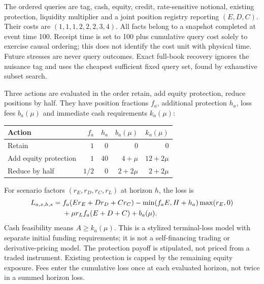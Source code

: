 \documentclass[11pt,a4paper]{article}
\theoremstyle{definition}\newtheorem{definition}[theorem]{Definition}
\begin{document}
The ordered queries are tag, cash, equity, credit, rate-sensitive notional, existing protection, liquidity multiplier and a joint position registry reporting $(E,D,C)$. Their costs are $(1,1,1,2,2,2,3,4)$. All facts belong to a snapshot completed at event time 100. Receipt time is set to 100 plus cumulative query cost solely to exercise causal ordering; this does not identify the cost unit with physical time. Future stresses are never query outcomes. Exact full-book recovery ignores the nuisance tag and uses the cheapest sufficient fixed query set, found by exhaustive subset search.

Three actions are evaluated in the order retain, add equity protection, reduce positions by half. They have position fractions $f_a$, additional protection $h_a$, loss fees $b_a(\mu)$ and immediate cash requirements $k_a(\mu)$:
\begin{center}\small
\begin{tabular}{lrrrr}
\toprule Action & $f_a$ & $h_a$ & $b_a(\mu)$ & $k_a(\mu)$ \\
\midrule Retain & $1$ & $0$ & $0$ & $0$ \\
Add equity protection & $1$ & $40$ & $4+\mu$ & $12+2\mu$ \\
Reduce by half & $1/2$ & $0$ & $2+2\mu$ & $2+2\mu$ \\
\bottomrule
\end{tabular}
\end{center}
For scenario factors $(r_E,r_D,r_C,r_L)$ at horizon $h$, the loss is
\begin{align}
 L_{a,x,h,s}={}&f_a(Er_E+Dr_D+Cr_C)
 -\min(f_aE,H+h_a)\max(r_E,0)\notag\\
 &+\mu r_Lf_a(E+D+C)+b_a(\mu).
 \label{eq:portfolioloss}
\end{align}
Cash feasibility means $A\ge k_a(\mu)$. This is a stylized terminal-loss model with separate initial funding requirements; it is not a self-financing trading or derivative-pricing model. The protection payoff is stipulated, not priced from a traded instrument. Existing protection is capped by the remaining equity exposure. Fees enter the cumulative loss once at each evaluated horizon, not twice in a summed horizon loss.
\end{document}

